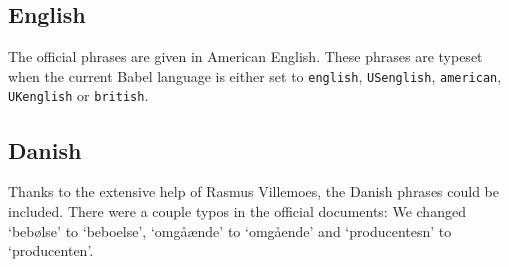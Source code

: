 \documentclass[a4paper,notitlepage]{scrreprt}
\begin{document}
{\begin{RandS}
    \rsskip
      {}
      {}
  \end{RandS}
}

\subsection{English}
The official phrases are given in American English. These phrases are typeset when the current Babel language is either set to \verb|english|, \verb|USenglish|, \verb|american|, \verb|UKenglish| or \verb|british|.
\allrsphrases
{}

\subsection{Danish}
Thanks to the extensive help of Rasmus Villemoes, the Danish phrases could be included. There were a couple typos in the official documents: We changed `bebølse' to `beboelse', `omgåænde' to `omgående' and `producentesn' to `producenten'.
\allrsphrases
{}
\end{document}
